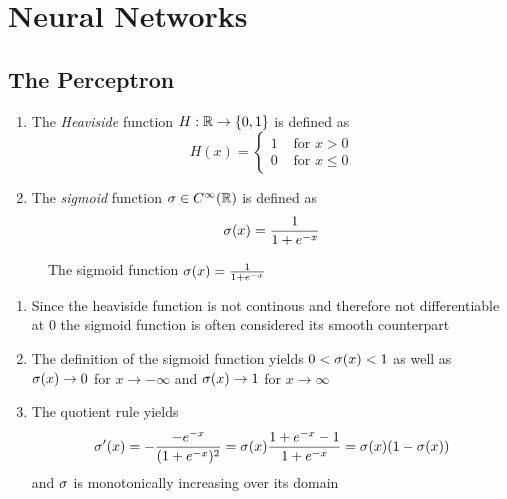 
\newpage
\section{Neural Networks}

\subsection{The Perceptron}

\begin{definition}\hfill
    \begin{enumerate}
		\item The \emph{Heaviside} function \( H: \mathbb{R} \to \{ 0, 1 \} \) is defined as
			\[
				H(x) = \left\{
					\begin{array}{ll}
						1 & \text{ for } x > 0 \\
						0 & \text{ for }x \le 0
					\end{array} 
				\right.
			\]
		\item The \emph{sigmoid} function \( \sigma \in C^\infty(\mathbb{R}) \) is defined as 
			\[
				\sigma(x) = \frac{1}{1 + e^{-x}}
			\]
    \end{enumerate}
\end{definition}
\bigskip


\begin{figure}[H]
	\centering
	\plotsigmoid
	\caption{The sigmoid function $ \sigma(x) = \frac{1}{1 + e^{-x}} $}\label{fig:sigmoid}
\end{figure}
\bigskip


\begin{remarks}\hfill
    \begin{enumerate}
		\item Since the heaviside function is not continous and therefore not differentiable at \( 0 \)
			the sigmoid function is often considered its smooth counterpart
		\item The definition of the sigmoid function yields \( 0 < \sigma(x) <  1 \) as well as 
			\( \sigma(x) \to 0 \) for \( x \to -\infty \) and \( \sigma(x) \to 1 \) for \( x \to \infty \)
		\item The quotient rule yields
			\[
				\sigma'(x) 
					= -\frac{-e^{-x}}{(1 + e^{-x})^2}
					= \sigma(x) \frac{1 + e^{-x} - 1}{1 + e^{-x}}
					= \sigma(x)(1 - \sigma(x))
			\]
			and \( \sigma \) is monotonically increasing over its domain
    \end{enumerate}
\end{remarks}
\bigskip


